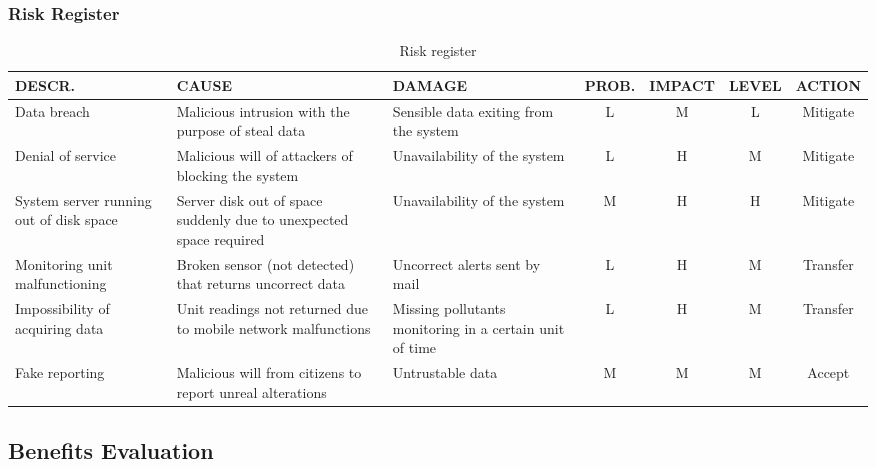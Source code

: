 \subsubsection{Risk Register}
\begin{table}[H]
    \centering
    \begin{tabularx}{\columnwidth}{|X|X|X|c|c|c|c|}
    \hline
    \textbf{DESCR.} & \textbf{CAUSE} & \textbf{DAMAGE} & \textbf{PROB.} & \textbf{IMPACT} & \textbf{LEVEL} & \textbf{ACTION} \\ \hline
    Data breach & Malicious intrusion with the purpose of steal data & Sensible data exiting from the system & \cellcolor{green!25}L & \cellcolor{orange!25}M & \cellcolor{green!25}L & Mitigate \\ \hline
    Denial of service & Malicious will of attackers of blocking the system & Unavailability of the system & \cellcolor{green!25}L & \cellcolor{red!25}H & \cellcolor{orange!25}M & Mitigate \\ \hline
    System server running out of disk space & Server disk out of space suddenly due to unexpected space required & Unavailability of the system & \cellcolor{orange!25}M & \cellcolor{red!25}H & \cellcolor{red!25}H & Mitigate \\ \hline
    Monitoring unit malfunctioning & Broken sensor (not detected) that returns uncorrect data & Uncorrect alerts sent by mail & \cellcolor{green!25}L & \cellcolor{red!25}H & \cellcolor{orange!25}M & Transfer \\ \hline
    Impossibility of acquiring data & Unit readings not returned due to mobile network malfunctions & Missing pollutants monitoring in a certain unit of time & \cellcolor{green!25}L & \cellcolor{red!25}H & \cellcolor{orange!25}M & Transfer \\ \hline
    Fake reporting & Malicious will from citizens to report unreal alterations & Untrustable data & \cellcolor{orange!25}M & \cellcolor{orange!25}M & \cellcolor{orange!25}M & Accept \\ \hline
    \end{tabularx}
    \caption{Risk register}
    \label{register}
\end{table}

\pagebreak
\subsection{Benefits Evaluation}
